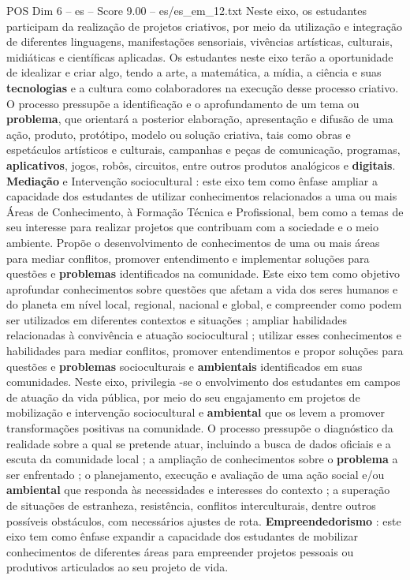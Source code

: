 \begin{textsample}{POS Dim 6 – es – Score 9.00 – es/es\_em\_12.txt}
Neste eixo, os estudantes participam da realização de projetos criativos, por meio da utilização e integração de diferentes linguagens, manifestações sensoriais, vivências artísticas, culturais, midiáticas e científicas aplicadas.
Os estudantes neste eixo terão a oportunidade de idealizar e criar algo, tendo a arte, a matemática, a mídia, a ciência e suas \textbf{tecnologias} e a cultura como colaboradores na execução desse processo criativo.
O processo pressupõe a identificação e o aprofundamento de um tema ou \textbf{problema}, que orientará a posterior elaboração, apresentação e difusão de uma ação, produto, protótipo, modelo ou solução criativa, tais como obras e espetáculos artísticos e culturais, campanhas e peças de comunicação, programas, \textbf{aplicativos}, jogos, robôs, circuitos, entre outros produtos analógicos e \textbf{digitais}. \textbf{Mediação} e Intervenção sociocultural : este eixo tem como ênfase ampliar a capacidade dos estudantes de utilizar conhecimentos relacionados a uma ou mais Áreas de Conhecimento, à Formação Técnica e Profissional, bem como a temas de seu interesse para realizar projetos que contribuam com a sociedade e o meio ambiente.
Propõe o desenvolvimento de conhecimentos de uma ou mais áreas para mediar conflitos, promover entendimento e implementar soluções para questões e \textbf{problemas} identificados na comunidade.
Este eixo tem como objetivo aprofundar conhecimentos sobre questões que afetam a vida dos seres humanos e do planeta em nível local, regional, nacional e global, e compreender como podem ser utilizados em diferentes contextos e situações ; ampliar habilidades relacionadas à convivência e atuação sociocultural ; utilizar esses conhecimentos e habilidades para mediar conflitos, promover entendimentos e propor soluções para questões e \textbf{problemas} socioculturais e \textbf{ambientais} identificados em suas comunidades.
Neste eixo, privilegia -se o envolvimento dos estudantes em campos de atuação da vida pública, por meio do seu engajamento em projetos de mobilização e intervenção sociocultural e \textbf{ambiental} que os levem a promover transformações positivas na comunidade.
O processo pressupõe o diagnóstico da realidade sobre a qual se pretende atuar, incluindo a busca de dados oficiais e a escuta da comunidade local ; a ampliação de conhecimentos sobre o \textbf{problema} a ser enfrentado ; o planejamento, execução e avaliação de uma ação social e/ou \textbf{ambiental} que responda às necessidades e interesses do contexto ; a superação de situações de estranheza, resistência, conflitos interculturais, dentre outros possíveis obstáculos, com necessários ajustes de rota. \textbf{Empreendedorismo} : este eixo tem como ênfase expandir a capacidade dos estudantes de mobilizar conhecimentos de diferentes áreas para empreender projetos pessoais ou produtivos articulados ao seu projeto de vida.

\end{textsample}
